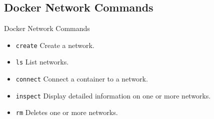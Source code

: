 \subsection{Docker Network Commands}\label{subsec:docker-network-commands}
\begin{frame}{Docker Network Commands}
    \begin{itemize}
        \item \texttt{create} Create a network.
        \pause
        \item \texttt{ls} List networks.
        \pause
        \item \texttt{connect} Connect a container to a network.
        \pause
        \item \texttt{inspect} Display detailed information on one or more networks.
        \pause
        \item \texttt{rm} Deletes one or more networks.
        \pause
        
    \end{itemize}
\end{frame}